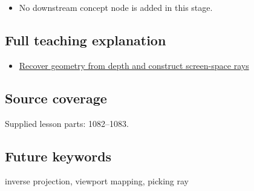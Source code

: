 \begin{itemize}
\tightlist
\item
  No downstream concept node is added in this stage.
\end{itemize}

\subsection{Full teaching explanation}\label{full-teaching-explanation}

\begin{itemize}
\tightlist
\item
  \href{Continuous\%20Notes/Computing\%20Foundations\%20-\%20From\%20Bits\%20to\%20C++\%20and\%20Systems\%20APIs\#Recover\%20geometry\%20from\%20depth\%20and\%20construct\%20screen-space\%20rays}{Recover geometry from depth and construct screen-space rays}
\end{itemize}

\subsection{Source coverage}\label{source-coverage}

Supplied lesson parts: 1082--1083.

\subsection{Future keywords}\label{future-keywords}

inverse projection, viewport mapping, picking ray
